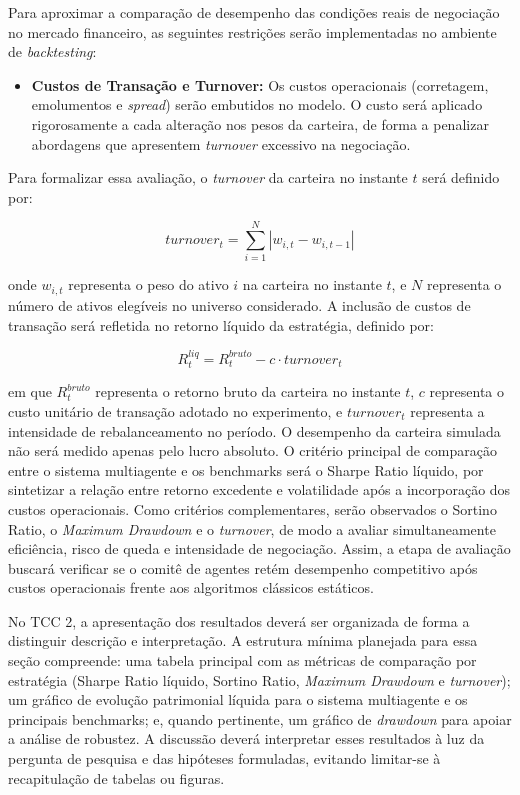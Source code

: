 \documentclass{eic-bcc-tcc}
\begin{document}
Para aproximar a comparação de desempenho das condições reais de negociação no mercado financeiro, as seguintes restrições serão implementadas no ambiente de \textit{backtesting}:
\begin{itemize}
    \item \textbf{Custos de Transação e Turnover:} Os custos operacionais (corretagem, emolumentos e \textit{spread}) serão embutidos no modelo. O custo será aplicado rigorosamente a cada alteração nos pesos da carteira, de forma a penalizar abordagens que apresentem \textit{turnover} excessivo na negociação.
\end{itemize}

Para formalizar essa avaliação, o \textit{turnover} da carteira no instante \(t\) será definido por:

\begin{equation}
\textit{turnover}_t = \sum_{i=1}^{N} |w_{i,t} - w_{i,t-1}|
\end{equation}

onde \(w_{i,t}\) representa o peso do ativo \(i\) na carteira no instante \(t\), e \(N\) representa o número de ativos elegíveis no universo considerado. A inclusão de custos de transação será refletida no retorno líquido da estratégia, definido por:

\begin{equation}
R^{liq}_t = R^{bruto}_t - c \cdot \textit{turnover}_t
\end{equation}

em que \(R^{bruto}_t\) representa o retorno bruto da carteira no instante \(t\), \(c\) representa o custo unitário de transação adotado no experimento, e \(\textit{turnover}_t\) representa a intensidade de rebalanceamento no período. O desempenho da carteira simulada não será medido apenas pelo lucro absoluto. O critério principal de comparação entre o sistema multiagente e os benchmarks será o Sharpe Ratio líquido, por sintetizar a relação entre retorno excedente e volatilidade após a incorporação dos custos operacionais. Como critérios complementares, serão observados o Sortino Ratio, o \textit{Maximum Drawdown} e o \textit{turnover}, de modo a avaliar simultaneamente eficiência, risco de queda e intensidade de negociação. Assim, a etapa de avaliação buscará verificar se o comitê de agentes retém desempenho competitivo após custos operacionais frente aos algoritmos clássicos estáticos.

No TCC 2, a apresentação dos resultados deverá ser organizada de forma a distinguir descrição e interpretação. A estrutura mínima planejada para essa seção compreende: uma tabela principal com as métricas de comparação por estratégia (Sharpe Ratio líquido, Sortino Ratio, \textit{Maximum Drawdown} e \textit{turnover}); um gráfico de evolução patrimonial líquida para o sistema multiagente e os principais benchmarks; e, quando pertinente, um gráfico de \textit{drawdown} para apoiar a análise de robustez. A discussão deverá interpretar esses resultados à luz da pergunta de pesquisa e das hipóteses formuladas, evitando limitar-se à recapitulação de tabelas ou figuras.
\end{document}
